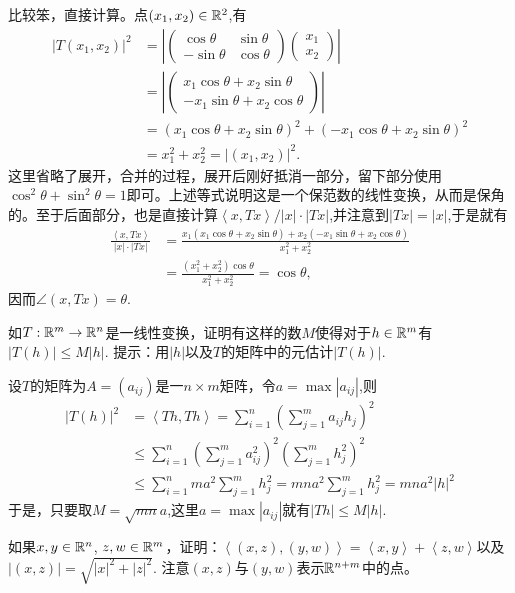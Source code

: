 \begin{problemset}
比较笨，直接计算。点$(x_1,x_2) \in \mathbb{R}^2$,有
\[
\begin{aligned}
|T(x_1,x_2)|^2 &= \left|\begin{pmatrix}\cos{\theta} & \sin{\theta} \\-\sin{\theta} & \cos{\theta}\end{pmatrix}\begin{pmatrix}x_1\\x_2\end{pmatrix}\right|\\
&=\left|\begin{pmatrix}x_1\cos{\theta} + x_2\sin{\theta}\\-x_1\sin{\theta} + x_2\cos{\theta}\end{pmatrix}\right|\\
&=(x_1\cos{\theta} + x_2\sin{\theta})^2+(-x_1\cos{\theta} + x_2\sin{\theta})^2\\
&=x_1^2 + x_2^2 = |(x_1,x_2)|^2.
\end{aligned}
\]
这里省略了展开，合并的过程，展开后刚好抵消一部分，留下部分使用$\cos^2{\theta} + \sin^2{\theta}=1$即可。上述等式说明这是一个保范数的线性变换，从而是保角的。至于后面部分，也是直接计算$\left<x, Tx\right>/|x|\cdot|Tx|$,并注意到$|Tx|=|x|$,于是就有
\[
\begin{aligned}
\frac{\left<x, Tx\right>}{|x|\cdot|Tx|} &= \frac{x_1(x_1\cos{\theta} + x_2\sin{\theta}) + x_2(-x_1\sin{\theta} + x_2\cos{\theta})}{x_1^2+x_2^2} \\
&= \frac{(x_1^2+x_2^2)\cos{\theta}}{x_1^2+x_2^2} = \cos{\theta},
\end{aligned}
\]
因而$\angle(x, Tx) = \theta$.


\item\label{exer009010110} 如$T:\mathbb{R}^m \to \mathbb{R}^n$是一线性变换，证明有这样的数$M$使得对于$h \in \mathbb{R}^m$有$|T(h)| \le M|h|$. 提示：用$|h|$以及$T$的矩阵中的元估计$|T(h)|$.

设$T$的矩阵为$A = (a_{ij})$是一$n \times m$矩阵，令$a=\max{|a_{ij}|}$,则
\[
\begin{aligned}
|T(h)|^2 &= \left<Th,Th\right> = \sum_{i=1}^{n}{(\sum_{j=1}^{m}{a_{ij}h_j})^2}\\
&\le \sum_{i=1}^{n}{(\sum_{j=1}^{m}{a_{ij}^2})^2(\sum_{j=1}^{m}{h_j^2})^2}\\
&\le \sum_{i=1}^{n}{ma^2\sum_{j=1}^{m}{h_j^2}} = mna^2\sum_{j=1}^{m}{h_j^2} = mna^2|h|^2
\end{aligned}
\]
于是，只要取$M = \sqrt{mn}a$,这里$a = \max{|a_{ij}|}$就有$|Th| \le M|h|$.

\item 如果$x, y \in \mathbb{R}^n$, $z, w \in \mathbb{R}^m$，证明：$\left<(x, z), (y,w)\right> = \left<x, y\right> + \left<z, w\right>$以及$|(x, z)| = \sqrt{|x|^2 + |z|^2}$. 注意$(x, z)$与$(y,w)$表示$\mathbb{R}^{n+m}$中的点。


\end{problemset}
